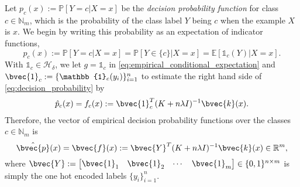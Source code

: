 \documentclass{article}
\begin{document}
	Let $p_{c}(x) := \mathbb{P}[Y = c | X = x]$ be the \textit{decision probability function} for class $c \in \mathbb{N}_{m}$, which is the probability of the class label $Y$ being $c$ when the example $X$ is $x$. We begin by writing this probability as an expectation of indicator functions,
	\begin{equation}
		p_{c}(x) := \mathbb{P}[Y = c | X = x] = \mathbb{P}[Y \in \{c\} | X = x] = \mathbb{E}[\mathbb{1}_{c}(Y) | X = x].
	\label{eq:decision_probability}
	\end{equation}	
	With $\mathbb{1}_{c} \in \mathcal{H}_{\delta}$, we let $g = \mathbb{1}_{c}$ in \eqref{eq:empirical_conditional_expectation} and $\bvec{1}_{c} := \{\mathbb{1}_{c}(y_{i})\}_{i = 1}^{n}$ to estimate the right hand side of \eqref{eq:decision_probability} by
	\begin{equation}
		\hat{p}_{c}(x) = f_{c}(x) := \bvec{1}_{c}^{T} (K + n \lambda I)^{-1} \bvec{k}(x).
	\label{eq:empirical_decision_probability}
	\end{equation}
	Therefore, the vector of empirical decision probability functions over the classes $c \in \mathbb{N}_{m}$ is
	\begin{equation}
		\hat{\bvec{p}}(x) = \bvec{f}(x) := \bvec{Y}^{T} (K + n \lambda I)^{-1} \bvec{k}(x) \in \mathbb{R}^{m},
	\label{eq:empirical_decision_probability_vector}
	\end{equation}
	where $\bvec{Y} := \begin{bmatrix} \bvec{1}_{1} & \bvec{1}_{2} & \cdots & \bvec{1}_{m} \end{bmatrix} \in \{0, 1\}^{n \times m}$ is simply the one hot encoded labels $\{y_{i}\}_{i = 1}^{n}$.
\end{document}
